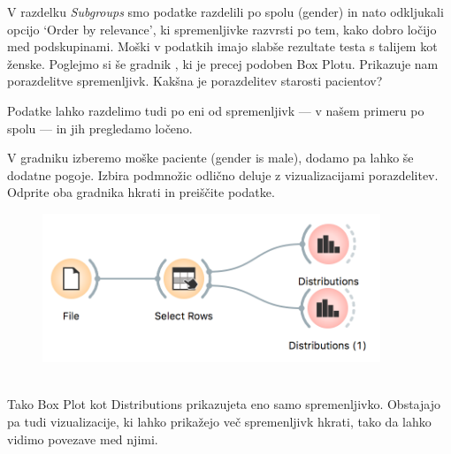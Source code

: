 V razdelku \textit{Subgroups} smo podatke razdelili po spolu (gender) in nato odkljukali opcijo ‘Order by relevance’, ki spremenljivke razvrsti po tem, kako dobro ločijo med podskupinami. Moški v podatkih imajo slabše rezultate testa s talijem kot ženske.
Poglejmo si še gradnik , ki je precej podoben Box Plotu. Prikazuje nam porazdelitve spremenljivk. Kakšna je porazdelitev starosti pacientov?

Podatke lahko razdelimo tudi po eni od spremenljivk  — v našem primeru po spolu — in jih pregledamo ločeno.

\newpage
\clearpage

V gradniku  izberemo moške paciente (gender is male), dodamo pa lahko še dodatne pogoje. Izbira podmnožic odlično deluje z vizualizacijami porazdelitev. Odprite oba gradnika hkrati in preiščite podatke.


\begin{figure}[h]
    \centering
    \includegraphics[width=0.9\textwidth]{select-rows-workflow.png}
    \caption{$\;$}  %
\end{figure}

Tako Box Plot kot Distributions prikazujeta eno samo spremenljivko. Obstajajo pa tudi vizualizacije, ki lahko prikažejo več spremenljivk hkrati, tako da lahko vidimo povezave med njimi.

